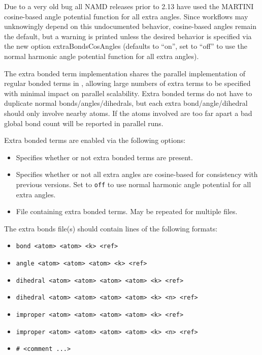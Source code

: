 Due to a very old bug all NAMD releases prior to 2.13 have used the
MARTINI cosine-based angle potential function for all extra angles.
Since workflows may unknowingly depend on this undocumented behavior,
cosine-based angles remain the default, but a warning is printed
unless the desired behavior is specified via the new option
extraBondsCosAngles (defaults to ``on'', set to ``off'' to use
the normal harmonic angle potential function for all extra angles).

The extra bonded term implementation shares the parallel implementation
of regular bonded terms in \NAMD, allowing large numbers of extra terms
to be specified with minimal impact on parallel scalability.
Extra bonded terms do not have to duplicate normal bonds/angles/dihedrals,
but each extra bond/angle/dihedral should only involve nearby atoms.
If the atoms involved are too far apart a bad global bond count will be
reported in parallel runs.

Extra bonded terms are enabled via the following options:

\begin{itemize}

\item
{}
{Specifies whether or not extra bonded terms are present.} 

\item
{}
{Specifies whether or not all extra angles are cosine-based for consistency with previous versions.
Set to {\tt off} to use normal harmonic angle potential for all extra angles.} 

\item
{}
{File containing extra bonded terms.  May be repeated for multiple files.} 

\end{itemize}

The extra bonds file(s) should contain lines of the following formats:

\begin{itemize}
\item
{\tt bond <atom> <atom> <k> <ref>}
\item
{\tt angle <atom> <atom> <atom> <k> <ref>}
\item
{\tt dihedral <atom> <atom> <atom> <atom> <k> <ref>}
\item
{\tt dihedral <atom> <atom> <atom> <atom> <k> <n> <ref>}
\item
{\tt improper <atom> <atom> <atom> <atom> <k> <ref>}
\item
{\tt improper <atom> <atom> <atom> <atom> <k> <n> <ref>}
\item
{\tt \# <comment ...>}
\end{itemize}

